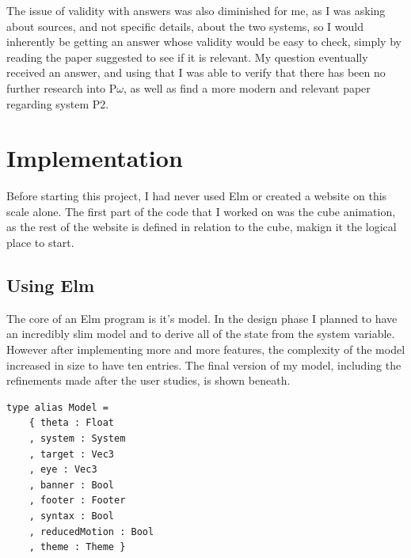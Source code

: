 \documentclass{l4proj}
\begin{document}
The issue of validity with answers was also diminished for me, as I was asking about sources, and not specific details, about the two systems, so I would inherently be getting an answer whose validity would be easy to check, simply by reading the paper suggested to see if it is relevant.  My question eventually received an answer, and using that I was able to verify that there has been no further research into P\underline{$\omega$}, as well as find a more modern and relevant paper regarding system P2.


\chapter{Implementation}

Before starting this project, I had never used Elm or created a website on this scale alone.  The first part of the code that I worked on was the cube animation, as the rest of the website is defined in relation to the cube, makign it the logical place to start.

\section{Using Elm}

The core of an Elm program is it's model.  In the design phase I planned to have an incredibly slim model and to derive all of the state from the system variable.  However after implementing more and more features, the complexity of the model increased in size to have ten entries.  The final version of my model, including the refinements made after the user studies, is shown beneath.

\begin{lstlisting}
type alias Model =
    { theta : Float
    , system : System
    , target : Vec3
    , eye : Vec3
    , banner : Bool
    , footer : Footer
    , syntax : Bool
    , reducedMotion : Bool
    , theme : Theme }
\end{lstlisting}
\end{document}
